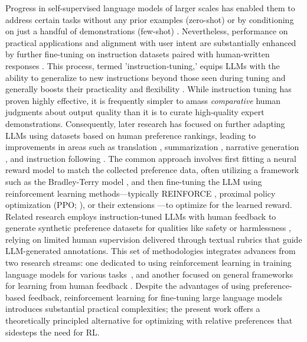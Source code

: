 Progress in self-supervised language models of larger scales has enabled them to address certain tasks without any prior examples (zero-shot) \citep{radford2019language} or by conditioning on just a handful of demonstrations (few-shot) \citep{gpt3,megatron,chowdhery2022palm}. Nevertheless, performance on practical applications and alignment with user intent are substantially enhanced by further fine-tuning on instruction datasets paired with human-written responses \citep{mishra-etal-2022-cross,sanh2022multitask,chung2022scaling,thoppilan2022lamda}. This process, termed 'instruction-tuning,' equips LLMs with the ability to generalize to new instructions beyond those seen during tuning and generally boosts their practicality and flexibility \citep{chung2022scaling}. While instruction tuning has proven highly effective, it is frequently simpler to amass \textit{comparative} human judgments about output quality than it is to curate high-quality expert demonstrations. Consequently, later research has focused on further adapting LLMs using datasets based on human preference rankings, leading to improvements in areas such as translation \citep{kreutzer-etal-2018-reliability}, summarization \citep{stiennon2022learning,ziegler2020finetuning}, narrative generation \citep{ziegler2020finetuning}, and instruction following \citep{ouyang2022training,ramamurthy2023is}. The common approach involves first fitting a neural reward model to match the collected preference data, often utilizing a framework such as the Bradley-Terry model \citep{bradley1952rankanalysis}, and then fine-tuning the LLM using reinforcement learning methods—typically REINFORCE \citep{williams1992reinforce}, proximal policy optimization (PPO; \cite{schulman2017proximal}), or their extensions \citep{ramamurthy2023is}—to optimize for the learned reward. Related research employs instruction-tuned LLMs with human feedback to generate synthetic preference datasets for qualities like safety or harmlessness \citep{bai2022constitutional}, relying on limited human supervision delivered through textual rubrics that guide LLM-generated annotations. This set of methodologies integrates advances from two research streams: one dedicated to using reinforcement learning in training language models for various tasks~\citep{Ranzato2015SequenceLT,paulus2018a,wu2018learning}, and another focused on general frameworks for learning from human feedback \citep{christiano2017deep,kupcsik2018learning}. Despite the advantages of using preference-based feedback, reinforcement learning for fine-tuning large language models introduces substantial practical complexities; the present work offers a theoretically principled alternative for optimizing with relative preferences that sidesteps the need for RL.

